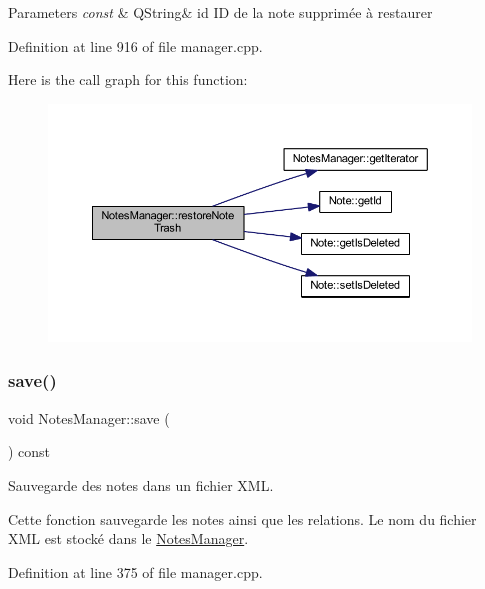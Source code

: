 \begin{DoxyParams}{Parameters}
{\em const} & Q\+String\& id ID de la note supprimée à restaurer \\
\hline
\end{DoxyParams}


Definition at line 916 of file manager.\+cpp.

Here is the call graph for this function\+:\nopagebreak
\begin{figure}[H]
\begin{center}
\leavevmode
\includegraphics[width=350pt]{class_notes_manager_abc6587a5d3986ae674e5dd4b9044f348_cgraph}
\end{center}
\end{figure}
\mbox{\label{class_notes_manager_ad271bd7f8079b01b04a32b886b498bac}} 
\subsubsection{\texorpdfstring{save()}{save()}}
{\footnotesize\ttfamily void Notes\+Manager\+::save (\begin{DoxyParamCaption}{ }\end{DoxyParamCaption}) const}



Sauvegarde des notes dans un fichier X\+ML. 

Cette fonction sauvegarde les notes ainsi que les relations. Le nom du fichier X\+ML est stocké dans le \hyperlink{class_notes_manager}{Notes\+Manager}. 

Definition at line 375 of file manager.\+cpp.


